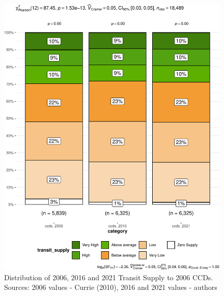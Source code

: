 \documentclass[preprint, 3p,
authoryear]{elsarticle} %
\begin{document}
\begin{figure}
\centering
\includegraphics{Leveraging_GTFS_to_assess_transit_supply_Transport_Geography_files/figure-latex/Greater_Melbourne_CCDs_SA1_table-1.pdf}
\caption{Distribution of 2006, 2016 and 2021 Transit Supply to 2006
CCDs. Sources: 2006 values - Currie (2010), 2016 and 2021 values -
authors}
\end{figure}
\end{document}
